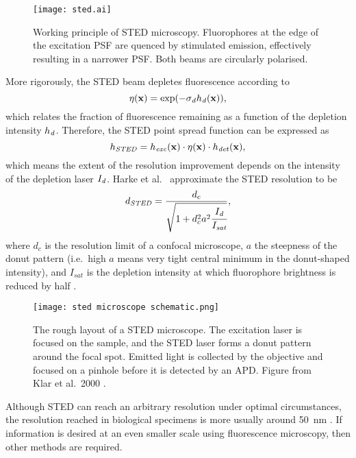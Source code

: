 \begin{figure}
	\centering
	\texttt{[image: sted.ai]}
	\caption{
		Working principle of STED microscopy. Fluorophores at the edge of the excitation PSF are quenced by stimulated emission, effectively resulting in a narrower PSF. Both beams are circularly polarised.
	}
	\label{fig:sted principle}
\end{figure}

More rigorously, the STED beam depletes fluorescence according to
\begin{equation}
	\eta(\vb{x}) = \exp(-\sigma_{\mathit{d}} h_{\mathit{d}}(\vb{x})),
\end{equation}
which relates the fraction of fluorescence remaining as a function of the depletion intensity $ h_{\mathit{d}} $. Therefore, the STED point spread function can be expressed as
\begin{equation}
	h_\mathit{STED} = h_\mathit{exc}(\vb{x}) \cdot \eta(\vb{x}) \cdot h_\mathit{det}(\vb{x}),
\end{equation}
which means the extent of the resolution improvement depends on the intensity of the depletion laser $ I_{\mathit{d}}$. Harke et al.~ approximate the STED resolution to be
\begin{equation}
	d_\mathit{STED} = \frac{d_c}{\sqrt{1+d_c^2a^2\cfrac{I_{\mathit{d}}}{I_\mathit{sat}}}},
\end{equation}
where $ d_c $ is the resolution limit of a confocal microscope, $ a $ the steepness of the donut pattern (i.e.~high $ a $ means very tight central minimum in the donut-shaped intensity), and $ I_\mathit{sat} $ is the depletion intensity at which fluorophore brightness is reduced by half \cite{Harke2008}.

\begin{figure}
	\centering
	\texttt{[image: sted microscope schematic.png]}
	\caption{
		The rough layout of a STED microscope. The excitation laser is focused on the sample, and the STED laser forms a donut pattern around the focal spot. Emitted light is collected by the objective and focused on a pinhole before it is detected by an APD. Figure from Klar et al.~2000 \cite{Klar2000}. 
	}
	\label{fig:sted microscope}
\end{figure}

Although STED can reach an arbitrary resolution under optimal circumstances, the resolution reached in biological specimens is more usually around 50~nm \cite{Wildanger2012,Muller2012}. If information is desired at an even smaller scale using fluorescence microscopy, then other methods are required.



